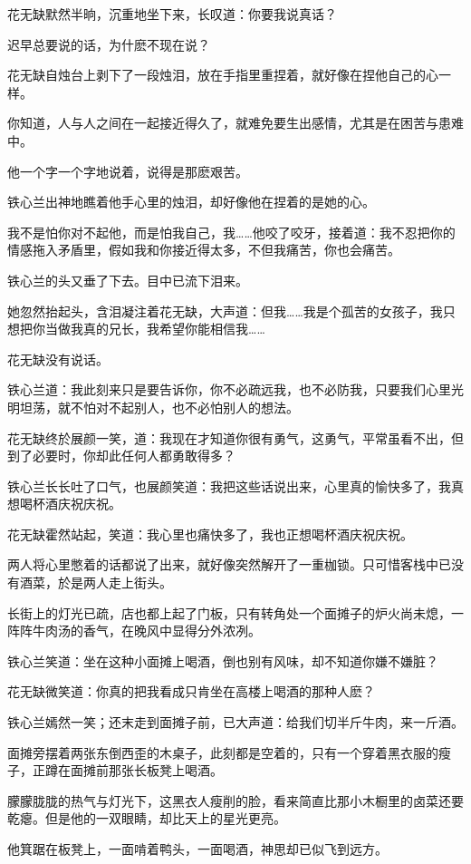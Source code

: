 \documentclass[12pt,oneside]{book}
\begin{document}
花无缺默然半晌，沉重地坐下来，长叹道：你要我说真话？

迟早总要说的话，为什麽不现在说？

花无缺自烛台上剥下了一段烛泪，放在手指里重捏着，就好像在捏他自己的心一样。

你知道，人与人之间在一起接近得久了，就难免要生出感情，尤其是在困苦与患难中。

他一个字一个字地说着，说得是那麽艰苦。

铁心兰出神地瞧着他手心里的烛泪，却好像他在捏着的是她的心。

我不是怕你对不起他，而是怕我自己，我\ldots\ldots 他咬了咬牙，接着道：我不忍把你的情感拖入矛盾里，假如我和你接近得太多，不但我痛苦，你也会痛苦。

铁心兰的头又垂了下去。目中已流下泪来。

她忽然抬起头，含泪凝注着花无缺，大声道：但我\ldots\ldots 我是个孤苦的女孩子，我只想把你当做我真的兄长，我希望你能相信我\ldots\ldots{}

花无缺没有说话。

铁心兰道：我此刻来只是要告诉你，你不必疏远我，也不必防我，只要我们心里光明坦荡，就不怕对不起别人，也不必怕别人的想法。

花无缺终於展颜一笑，道：我现在才知道你很有勇气，这勇气，平常虽看不出，但到了必要时，你却此任何人都勇敢得多？

铁心兰长长吐了口气，也展颜笑道：我把这些话说出来，心里真的愉快多了，我真想喝杯酒庆祝庆祝。

花无缺霍然站起，笑道：我心里也痛快多了，我也正想喝杯酒庆祝庆祝。

两人将心里憋着的话都说了出来，就好像突然解开了一重枷锁。只可惜客栈中已没有酒菜，於是两人走上街头。

长街上的灯光已疏，店也都上起了门板，只有转角处一个面摊子的炉火尚未熄，一阵阵牛肉汤的香气，在晚风中显得分外浓冽。

铁心兰笑道：坐在这种小面摊上喝酒，倒也别有风味，却不知道你嫌不嫌脏？

花无缺微笑道：你真的把我看成只肯坐在高楼上喝酒的那种人麽？

铁心兰嫣然一笑；还末走到面摊子前，已大声道：给我们切半斤牛肉，来一斤酒。

面摊旁摆着两张东倒西歪的木桌子，此刻都是空着的，只有一个穿着黑衣服的瘦子，正蹲在面摊前那张长板凳上喝酒。

朦朦胧胧的热气与灯光下，这黑衣人瘦削的脸，看来简直比那小木橱里的卤菜还要乾瘪。但是他的一双眼睛，却比天上的星光更亮。

他箕踞在板凳上，一面啃着鸭头，一面喝酒，神思却已似飞到远方。
\end{document}
